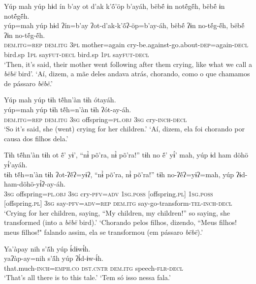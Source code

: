 \documentclass[output=paper,
modfonts,nonflat
]{langsci/langscibook}
\begin{document}
\newpage
\ea  Yúp mah yúp hɨd ín b’ay ot d’ak k’ö́’öp b’ayáh, bëbë́ ɨn notë́gë́h, bëbë́ ɨn notë́gë́h.\\
\gll yúp=mah yúp hɨd ʔín=b’ay ʔot-d’ak-k’ö́ʔ-öp=b’ay-áh, bëbë́ ʔɨn no-të́g-ë́h, bëbë́ ʔɨn no-të́g-ë́h.\\
     \textsc{dem.itg=rep} \textsc{dem.itg} \textsc{3pl} mother=again cry-be.against-go.about\textsc{-dep}=again\textsc{-decl} bird.sp \textsc{1pl} say\textsc{fut-decl} bird.sp \textsc{1pl} say\textsc{fut-decl}\\
\glt ‘Then, it’s said, their mother went following after them crying, like what we call a \textit{bëbë} bird'.
\glt ‘Aí, dizem, a mãe deles andava atrás, chorando, como o que chamamos de pássaro \textit{bëbë}.'
\z

\ea  Yúp mah yúp tɨh tẽ́hn’àn tɨh ótayáh.\\
\gll yúp=mah yúp tɨh tẽ́h=n’àn tɨh ʔót-ay-áh.\\
     \textsc{dem.itg=rep} \textsc{dem.itg} \textsc{3sg} offspring\textsc{=pl.obj} \textsc{3sg} cry\textsc{-inch-decl}\\
\glt ‘So it’s said, she (went) crying for her children.'
\glt ‘Aí, dizem, ela foi chorando por causa dos filhos dela.'
\z

\ea  Tɨh tẽ́hn’àn tɨh ot ë́’ yɨ’, “nɨ̀ põ'ra, nɨ̀ põ'ra!” tɨh no ë́’ yɨ́’ mah, yúp ɨd ham döhö yɨ́’ayáh.\\
\gll tɨh tẽ́h=n’àn tɨh ʔot-ʔë́ʔ=yɨʔ, “nɨ̀ põ'ra, nɨ̀ põ'ra!” tɨh no-ʔë́ʔ=yɨʔ=mah, yúp ʔɨd-ham-döhö-yɨ́ʔ-ay-áh.\\
     \textsc{3sg} offspring\textsc{=pl.obj} \textsc{3sg} cry\textsc{-pfv=adv} \textsc{1sg.poss} [offspring\textsc{.pl}] \textsc{1sg.poss} [offspring\textsc{.pl}] \textsc{3sg} say\textsc{-pfv=adv=rep} \textsc{dem.itg} say-go-transform\textsc{-tel-inch-decl}\\
\glt ‘Crying for her children, saying, “My children, my children!” so saying, she transformed (into a \textit{bëbë} bird).'{\footnotemark}
\glt ‘Chorando pelos filhos, dizendo, “Meus filhos! meus filhos!" falando assim, ela se transformou (em pássaro \textit{bëbë}).'
\z

\newpage
\ea  Ya’àpay nih s’ã́h yúp ɨ́dɨwɨ́h.\\
\gll yaʔàp-ay=nih s’ã́h yúp ʔɨ́d-ɨw-ɨ́h.\\
     that.much\textsc{-inch=emph.co} \textsc{dst.cntr} \textsc{dem.itg} speech\textsc{-flr-decl}\\
\glt ‘That’s all there is to this tale.'
\glt ‘Tem só isso nessa fala.'
\z
\end{document}

